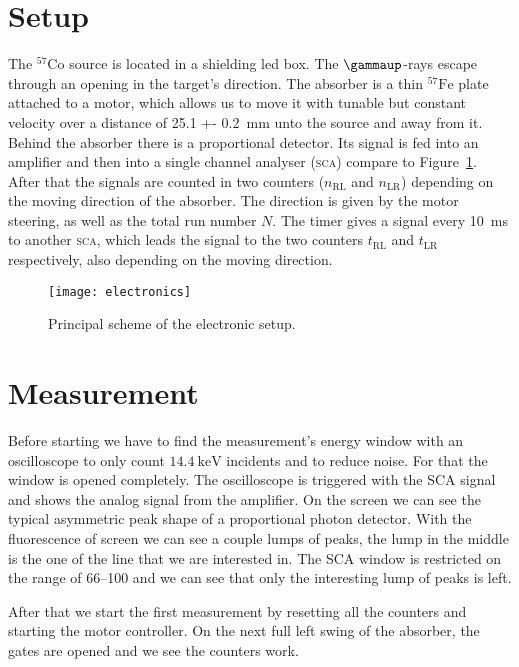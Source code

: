 \documentclass[11pt, english, fleqn, DIV=15, headinclude, BCOR=2cm]{scrreprt}
\begin{document}
\section{Setup}

The $^{57}\mathrm{Co}$ source is located in a shielding led box. The
$\gammaup$-rays escape through an opening in the target's direction. The
absorber is a thin $^{57}\mathrm{Fe}$ plate attached to a motor, which allows
us to move it with tunable but constant velocity over a distance of \SI{25.1 +-
0.2}{\milli\meter} unto the source and away from it. Behind the absorber there
is a proportional detector. Its signal is fed into an amplifier and then into a
single channel analyser (\textsc{sca}) compare to Figure~\ref{fig:electronics}.
After that the signals are counted in two counters ($n_\text{RL}$ and
$n_\text{LR}$) depending on the moving direction of the absorber. The direction
is given by the motor steering, as well as the total run number $N$. The timer
gives a signal every \SI{10}{\milli\second} to another \textsc{sca}, which
leads the signal to the two counters $t_\text{RL}$ and $t_\text{LR}$
respectively, also depending on the moving direction.

\begin{figure}
    \centering
    \texttt{[image: electronics]}
    \caption{%
        Principal scheme of the electronic setup.
    }
    \label{fig:electronics}
\end{figure}

\section{Measurement}

Before starting we have to find the measurement's energy window with an
oscilloscope to only count $\SI{14.4}{\kilo\electronvolt}$ incidents and to
reduce noise. For that the window is opened completely. The oscilloscope is
triggered with the SCA signal and shows the analog signal from the amplifier.
On the screen we can see the typical asymmetric peak shape of a proportional
photon detector. With the fluorescence of screen we can see a couple lumps of
peaks, the lump in the middle is the one of the line that we are interested in.
The SCA window is restricted on the range of \numrange{66}{100} and we can see
that only the interesting lump of peaks is left.

After that we start the first measurement by resetting all the
counters and starting the motor controller. On the next full left swing of the
absorber, the gates are opened and we see the counters work.
\end{document}
